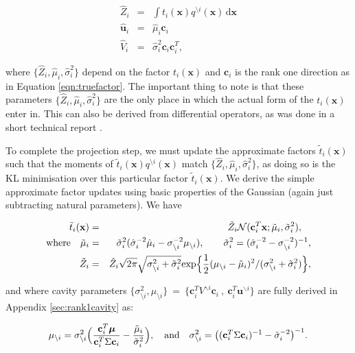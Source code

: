 \documentclass[twoside,11pt]{article}
\def\x{{\mathbf x}}
\def\c{{\mathbf c}}
\def\u{{\mathbf u}}
\def\boldmu{\bm{\mu}}
\renewcommand{\d}{\,\mathrm{d}}
\newcommand{\wo}{\setminus}
\begin{document}
\begin{eqnarray}
\label{eqn:r1moments}
\hat{Z}_i & = & \int t_i(\x) q^{\wo i}(\x) \d\x  \nonumber \\
\hat{\u}_i & = & \hat{\mu}_i   \c_i \nonumber \\
\hat{V}_i & = & \hat{\sigma}_i^2 \c_i \c_i^T,
\end{eqnarray}

\noindent where $\{\hat{Z}_i,\hat{\mu}_i,\hat{\sigma}_i^2\}$ depend on the factor $t_i(\x)$ and $\c_i$ is the rank one direction as in Equation \ref{eqn:truefactor}.   The important thing to note is that these parameters $\{\hat{Z}_i,\hat{\mu}_i,\hat{\sigma}_i^2\}$ are the only place in which the actual form of the $t_i(\x)$ enter in.   This can also be derived from differential operators, as was done in a short technical report \cite[]{minkaTR2008}.

To complete the projection step, we must update the approximate factors $\tilde{t}_i(\x)$ such that the moments of $\tilde{t}_i(\x)q^{\wo i}(\x)$ match $\{\hat{Z}_i,\hat{\mu}_i,\hat{\sigma}_i^2\}$, as doing so is the KL minimisation over this particular factor $\tilde{t}_i(\x)$.  We derive the simple approximate factor updates using basic properties of the Gaussian (again just subtracting natural parameters).  We have

\begin{eqnarray}
\label{eqn:site}
 \tilde{t}_i(\x) & = &
\tilde{Z}_i\mathcal{N}(\c_i^T\x; \tilde{\mu}_{i},\tilde{\sigma}^2_{i}),~~~\\
\mathrm{where}~~~\tilde{\mu}_{i} & = &
\tilde{\sigma}^2_{i}(\hat{\sigma}^{-2}_i\hat{\mu}_i -
{\sigma}^{-2}_{\wo i}{\mu}_{\wo i}),~~~~~~
\tilde{\sigma}^2_{i} = (\hat{\sigma}^{-2}_i -
\sigma^{-2}_{\wo i})^{-1},\nonumber\\
\tilde{Z}_i & = & \hat{Z}_i\sqrt{2\pi}\sqrt{\sigma^2_{\wo i} +
\tilde{\sigma}^2_i}\mathrm{exp}\Bigl\{\frac{1}{2}(\mu_{\wo i} -
\tilde{\mu}_i)^2/(\sigma^2_{\wo i} + \tilde{\sigma}_i^2)\Bigr\},\nonumber
\end{eqnarray}

\noindent and where cavity parameters $\{\sigma_{\wo i}^2,\mu_{\wo i} \} ~= ~\{ \c_i^TV^{\backslash i}\c_i ~,~ \c_i^T\u^{\backslash i} \}$ are fully derived in Appendix \ref{sec:rank1cavity} as:

\begin{eqnarray}
\label{eqn:cavityepmgp}
\mu_{\wo i} = \sigma_{\wo i}^2 \Bigl( \frac{\c_i^T\boldmu}{\c_i^T\Sigma\c_i} - \frac{\tilde{\mu}_i}{\tilde{\sigma}_i^2} \Bigr)
,~~~\mathrm{and}~~~
\sigma^2_{\wo i}  = \bigl( (\c_i^T\Sigma \c_i)^{-1} - \tilde{\sigma}^{-2}_i\bigr)^{-1}.
\end{eqnarray}
\end{document}
